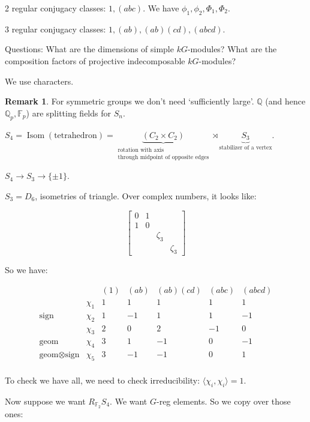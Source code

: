 \documentclass{article}
\theoremstyle{definition}
\newtheorem*{remark}{Remark}
\begin{document}
2 regular conjugacy classes: \(1, (abc)\). We have \(\phi_1, \phi_2, \Phi_1, \Phi_2\).

3 regular conjugacy classes: \(1, (ab), (ab)(cd), (abcd)\).

Questions: What are the dimensions of simple \(kG\)-modules? What are the composition factors of projective indecomposable \(kG\)-modules?

We use characters.

\begin{remark}
    For symmetric groups we don't need `sufficiently large'. \(\mathbb{Q}\) (and hence \(\mathbb{Q}_p, \mathbb{F}_p\)) are splitting fields for \(S_n\).
\end{remark}

\(S_4 = \operatorname{Isom}(\text{tetrahedron}) = \underbrace{(C_2 \times C_2)}_{\substack{\text{rotation with axis} \\ \text{through midpoint of opposite edges}}} \rtimes \underbrace{S_3}_{\text{stabilizer of a vertex}}\).

\(S_4 \to S_3 \to \{ \pm 1 \} \).

\(S_3 = D_6\), isometries of triangle. Over complex numbers, it looks like:

\[
    \begin{bmatrix}
        0 & 1 & & \\
        1 & 0 & & \\
        & & \zeta_3 & \\
        & & & \zeta_3
    \end{bmatrix}
\]

So we have:

\[
    \begin{matrix}
       & & (1) & (ab) & (ab)(cd) & (abc) & (abcd) \\
    & \chi_1 & 1 & 1 & 1 & 1 & 1\\
    \text{sign} & \chi_2 & 1 & -1 & 1 & 1 & -1 \\
    & \chi_3 & 2 & 0 & 2 & -1 & 0 \\
    \text{geom} & \chi_4 & 3 & 1 & -1 & 0 & -1  \\
    \text{geom} \otimes \text{sign} & \chi_5 & 3 & -1 & -1 & 0 & 1 \\
    \end{matrix}
\]

To check we have all, we need to check irreducibility: \(\langle \chi_i, \chi_i \rangle = 1\).

Now suppose we want \(R_{\mathbb{F}_2}S_4\). We want \(G\)-reg elements. So we copy over those ones:
\end{document}

